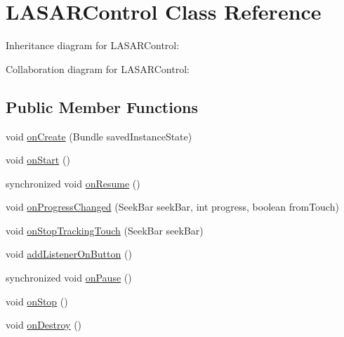 \hypertarget{classcom_1_1example_1_1android_1_1_bluetooth_chat_1_1_l_a_s_a_r_control}{\section{L\-A\-S\-A\-R\-Control Class Reference}
\label{classcom_1_1example_1_1android_1_1_bluetooth_chat_1_1_l_a_s_a_r_control}
}


Inheritance diagram for L\-A\-S\-A\-R\-Control\-:


Collaboration diagram for L\-A\-S\-A\-R\-Control\-:
\subsection*{Public Member Functions}
\begin{DoxyCompactItemize}
\item 
void \hyperlink{classcom_1_1example_1_1android_1_1_bluetooth_chat_1_1_l_a_s_a_r_control_a85e87cb5ced88dff7c8173ecc4f636d1}{on\-Create} (Bundle saved\-Instance\-State)
\item 
void \hyperlink{classcom_1_1example_1_1android_1_1_bluetooth_chat_1_1_l_a_s_a_r_control_a11bcf4e3177fdb549350a4aa149e9e67}{on\-Start} ()
\item 
synchronized void \hyperlink{classcom_1_1example_1_1android_1_1_bluetooth_chat_1_1_l_a_s_a_r_control_a45b78fc913c5af291d89fd7e5a8aa601}{on\-Resume} ()
\item 
void \hyperlink{classcom_1_1example_1_1android_1_1_bluetooth_chat_1_1_l_a_s_a_r_control_ac98847d21be8b44457423bb004e2e655}{on\-Progress\-Changed} (Seek\-Bar seek\-Bar, int progress, boolean from\-Touch)
\item 
void \hyperlink{classcom_1_1example_1_1android_1_1_bluetooth_chat_1_1_l_a_s_a_r_control_abb13b75125cb8cb24fbeeef2451e262c}{on\-Stop\-Tracking\-Touch} (Seek\-Bar seek\-Bar)
\item 
void \hyperlink{classcom_1_1example_1_1android_1_1_bluetooth_chat_1_1_l_a_s_a_r_control_ae52c93cc72458772ce286f19d7cb6760}{add\-Listener\-On\-Button} ()
\item 
synchronized void \hyperlink{classcom_1_1example_1_1android_1_1_bluetooth_chat_1_1_l_a_s_a_r_control_a0e46f04a72924962b5bdb1e5aff7ddc4}{on\-Pause} ()
\item 
void \hyperlink{classcom_1_1example_1_1android_1_1_bluetooth_chat_1_1_l_a_s_a_r_control_a458397229d0b2076a739955b1cb8be35}{on\-Stop} ()
\item 
void \hyperlink{classcom_1_1example_1_1android_1_1_bluetooth_chat_1_1_l_a_s_a_r_control_a8a744b43949a3939f448facad211e3d2}{on\-Destroy} ()

\end{DoxyCompactItemize}
